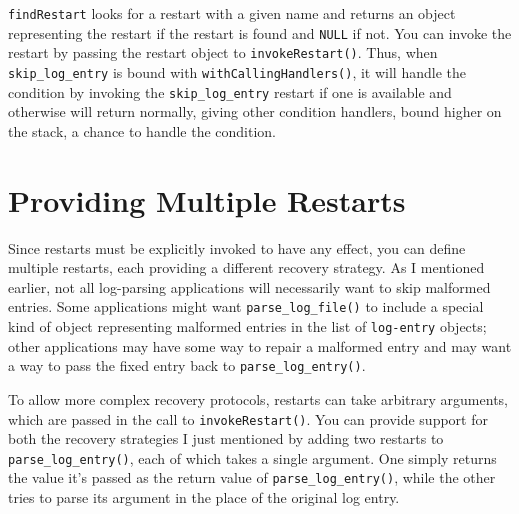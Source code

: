 \begin{Shaded}
\begin{Highlighting}[]
\StringTok{ }
  \StringTok{ }\NormalTok{(}\NormalTok{) }
  \NormalTok{()}
  
\NormalTok{\}}
\end{Highlighting}
\end{Shaded}

\texttt{findRestart} looks for a restart with a given name and returns
an object representing the restart if the restart is found and
\texttt{NULL} if not. You can invoke the restart by passing the restart
object to \texttt{invokeRestart()}. Thus, when \texttt{skip\_log\_entry}
is bound with \texttt{withCallingHandlers()}, it will handle the
condition by invoking the \texttt{skip\_log\_entry} restart if one is
available and otherwise will return normally, giving other condition
handlers, bound higher on the stack, a chance to handle the condition.

\section{Providing Multiple Restarts}

Since restarts must be explicitly invoked to have any effect, you can
define multiple restarts, each providing a different recovery strategy.
As I mentioned earlier, not all log-parsing applications will
necessarily want to skip malformed entries. Some applications might want
\texttt{parse\_log\_file()} to include a special kind of object
representing malformed entries in the list of \texttt{log-entry}
objects; other applications may have some way to repair a malformed
entry and may want a way to pass the fixed entry back to
\texttt{parse\_log\_entry()}.

To allow more complex recovery protocols, restarts can take arbitrary
arguments, which are passed in the call to \texttt{invokeRestart()}. You
can provide support for both the recovery strategies I just mentioned by
adding two restarts to \texttt{parse\_log\_entry()}, each of which takes
a single argument. One simply returns the value it's passed as the
return value of \texttt{parse\_log\_entry()}, while the other tries to
parse its argument in the place of the original log entry.

